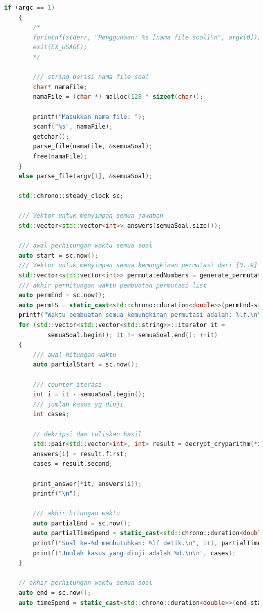 \documentclass{article}
\begin{document}
\begin{lstlisting}[caption = "main.cpp", language = c++]
    if (argc == 1)
    {
        /*
        fprintnf(stderr, "Penggunaan: %s [nama file soal]\n", argv[0]);
        exit(EX_USAGE);
        */

        /// string berisi nama file soal
        char* namaFile;
        namaFile = (char *) malloc(128 * sizeof(char));

        printf("Masukkan nama file: ");
        scanf("%s", namaFile);
        getchar();
        parse_file(namaFile, &semuaSoal);
        free(namaFile);
    }
    else parse_file(argv[1], &semuaSoal);

    std::chrono::steady_clock sc;

    /// Vektor untuk menyimpan semua jawaban
    std::vector<std::vector<int>> answers(semuaSoal.size());

    /// awal perhitungan waktu semua soal
    auto start = sc.now();
    /// Vektor untuk menyimpan semua kemungkinan permutasi dari [0..9]
    std::vector<std::vector<int>> permutatedNumbers = generate_permutated_numbers(MAX_UNIQUE_LETTERS);
    /// akhir perhitungan waktu pembuatan permutasi list
    auto permEnd = sc.now();
    auto permTS = static_cast<std::chrono::duration<double>>(permEnd-start);
    printf("Waktu pembuatan semua kemungkinan permutasi adalah: %lf.\n\n", permTS.count());
    for (std::vector<std::vector<std::string>>::iterator it =
            semuaSoal.begin(); it != semuaSoal.end(); ++it)
    {
        /// awal hitungan waktu
        auto partialStart = sc.now();

        /// counter iterasi
        int i = it - semuaSoal.begin();
        /// jumlah kasus yg diuji
        int cases;

        // dekripsi dan tuliskan hasil
        std::pair<std::vector<int>, int> result = decrypt_cryparithm(*it, permutatedNumbers);
        answers[i] = result.first;
        cases = result.second;

        print_answer(*it, answers[i]);
        printf("\n");

        /// akhir hitungan waktu
        auto partialEnd = sc.now();
        auto partialTimeSpend = static_cast<std::chrono::duration<double>>(partialEnd-partialStart);
        printf("Soal ke-%d membutuhkan: %lf detik.\n", i+1, partialTimeSpend.count());
        printf("Jumlah kasus yang diuji adalah %d.\n\n", cases);
    }

    // akhir perhitungan waktu semua soal
    auto end = sc.now();
    auto timeSpend = static_cast<std::chrono::duration<double>>(end-start);


\end{lstlisting}
\end{document}
